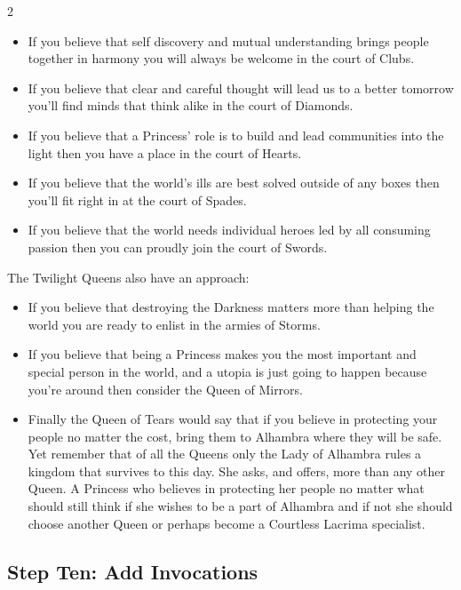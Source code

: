\begin{multicols}{2}
\begin{itemize}
\item If you believe that self discovery and mutual understanding brings people together in harmony you will always be welcome in the court of Clubs.
\item If you believe that clear and careful thought will lead us to a better tomorrow you'll find minds that think alike in the court of Diamonds.
\item If you believe that a Princess' role is to build and lead communities into the light then you have a place in the court of Hearts.
\item If you believe that the world's ills are best solved outside of any boxes then you'll fit right in at the court of Spades.
\item If you believe that the world needs individual heroes led by all consuming passion then you can proudly join the court of Swords. \\
\end{itemize}

The Twilight Queens also have an approach:

\begin{itemize}
\item If you believe that destroying the Darkness matters more than helping the world you are ready to enlist in the armies of Storms.
\item If you believe that being a Princess makes you the most important and special person in the world, and a utopia is just going to happen because you're around then consider the Queen of Mirrors.
\item Finally the Queen of Tears would say that if you believe in protecting your people no matter the cost, bring them to Alhambra where they will be safe. Yet remember that of all the Queens only the Lady of Alhambra rules a kingdom that survives to this day. She asks, and offers, more than any other Queen. A Princess who believes in protecting her people no matter what should still think if she wishes to be a part of Alhambra and if not she should choose another Queen or perhaps become a Courtless Lacrima specialist. 
\end{itemize}



\bigsidebarend

\subsection*{Step Ten: Add Invocations} 


\end{multicols}
